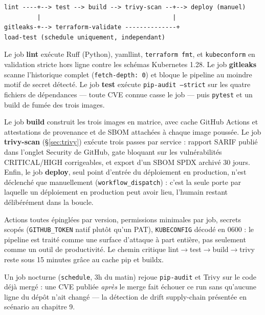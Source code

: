 \documentclass[12pt,a4paper,twoside,openright]{report}
\begin{document}
\begin{lstlisting}[caption={Ordre et dépendances des jobs}]
lint ----+--> test --> build --> trivy-scan --+--> deploy (manuel)
         |                                    |
gitleaks-+--> terraform-validate --------------+
load-test (schedule uniquement, independant)
\end{lstlisting}

Le job \textbf{lint} exécute Ruff (Python), yamllint, \texttt{terraform fmt}, et
\texttt{kubeconform} en validation stricte hors ligne contre les schémas Kubernetes
1.28. Le job \textbf{gitleaks} scanne l'historique complet
(\texttt{fetch-depth: 0}) et bloque le pipeline au moindre motif de secret détecté.
Le job \textbf{test} exécute \texttt{pip-audit --strict} sur les quatre fichiers de
dépendances — toute CVE connue casse le job — puis \texttt{pytest} et un build de
fumée des trois images.

Le job \textbf{build} construit les trois images en matrice, avec cache GitHub
Actions et attestations de provenance et de SBOM attachées à chaque image poussée.
Le job \textbf{trivy-scan} (\S\ref{sec:trivy}) exécute trois passes par service :
rapport SARIF publié dans l'onglet Security de GitHub, gate bloquant sur les
vulnérabilités CRITICAL/HIGH corrigeables, et export d'un SBOM SPDX archivé 30
jours. Enfin, le job \textbf{deploy}, seul point d'entrée du déploiement en
production, n'est déclenché que manuellement (\texttt{workflow\_dispatch}) : c'est
la seule porte par laquelle un déploiement en production peut avoir lieu, l'humain
restant délibérément dans la boucle.

\begin{whybox}[title={Le pipeline se durcit lui-même}]
\label{sec:trivy}
Actions toutes épinglées par version, permissions minimales par job, secrets
scopés (\texttt{GITHUB\_TOKEN} natif plutôt qu'un PAT), \texttt{KUBECONFIG} décodé en
0600 : le pipeline est traité comme une surface d'attaque à part entière, pas
seulement comme un outil de productivité. Le chemin critique
lint$\rightarrow$test$\rightarrow$build$\rightarrow$trivy reste sous 15 minutes
grâce au cache pip et buildx.
\end{whybox}

Un job nocturne (\texttt{schedule}, 3h du matin) rejoue \texttt{pip-audit} et Trivy
sur le code déjà mergé : une CVE publiée \emph{après} le merge fait échouer ce run
sans qu'aucune ligne du dépôt n'ait changé — la détection de drift supply-chain
présentée en scénario au chapitre 9.
\end{document}
